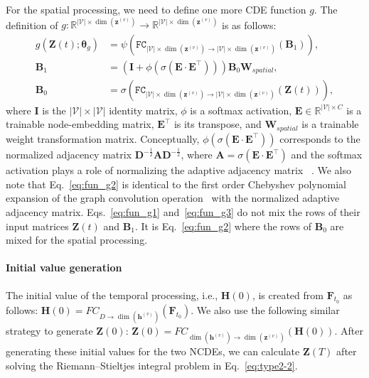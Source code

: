\documentclass[letterpaper]{article} \usepackage{aaai22}  \usepackage{times}  \usepackage{helvet}  \usepackage{courier}  \usepackage[hyphens]{url}  \usepackage{graphicx} \urlstyle{rm} \def\UrlFont{\rm}  \usepackage{natbib}  \usepackage{caption} \DeclareCaptionStyle{ruled}{labelfont=normalfont,labelsep=colon,strut=off} \frenchspacing  \setlength{\pdfpagewidth}{8.5in}  \setlength{\pdfpageheight}{11in}  \usepackage{stfloats}
\begin{document}
For the spatial processing, we need to define one more CDE function $g$. The definition of $g:\mathbb{R}^{|\mathcal{V}| \times \dim(\bm{z}^{(v)})} \rightarrow \mathbb{R}^{|\mathcal{V}| \times \dim(\bm{z}^{(v)})}$ is as follows:
\begin{align}
g(\bm{Z}(t);\bm{\theta}_g) &= \psi(\texttt{FC}_{|\mathcal{V}| \times \dim(\bm{z}^{(v)}) \rightarrow |\mathcal{V}| \times \dim(\bm{z}^{(v)})}(\bm{B}_1)),\label{eq:fun_g1}\\
\bm{B}_1 &= (\bm{I} + \phi(\sigma(\bm{E}\cdot\bm{E}^{\intercal})))\bm{B}_0\bm{W}_{spatial},\label{eq:fun_g2}\\
\bm{B}_0 &= \sigma(\texttt{FC}_{|\mathcal{V}| \times \dim(\bm{z}^{(v)}) \rightarrow |\mathcal{V}| \times \dim(\bm{z}^{(v)})}(\bm{Z}(t))),\label{eq:fun_g3}
\end{align}
where $\bm{I}$ is the $|\mathcal{V}| \times |\mathcal{V}|$ identity matrix, $\phi$ is a softmax activation, $\bm{E} \in \mathbb{R}^{|\mathcal{V}| \times C} $ is a trainable node-embedding matrix, $\bm{E}^{\intercal}$ is its transpose, and $\bm{W}_{spatial}$ is a trainable weight transformation matrix. Conceptually, $\phi(\sigma(\bm{E}\cdot\bm{E}^{\intercal}))$ corresponds to the normalized adjacency matrix $\bm{D}^{-\frac{1}{2}}\bm{A}\bm{D}^{-\frac{1}{2}}$, where $\bm{A} = \sigma(\bm{E}\cdot\bm{E}^{\intercal})$ and the softmax activation plays a role of normalizing the adaptive adjacency matrix ~\cite{wu2019graphwavenet,NEURIPS2020_ce1aad92}. We also note that Eq.~\eqref{eq:fun_g2} is identical to the first order Chebyshev polynomial expansion of the graph convolution operation~\cite{kipf2017semi} with the normalized adaptive adjacency matrix. Eqs.~\eqref{eq:fun_g1} and~\eqref{eq:fun_g3} do not mix the rows of their input matrices $\bm{Z}(t)$ and $\bm{B}_1$. It is Eq.~\eqref{eq:fun_g2} where the rows of $\bm{B}_0$ are mixed for the spatial processing.

\paragraph{Initial value generation} The initial value of the temporal processing, i.e., $\bm{H}(0)$, is created from $\bm{F}_{t_0}$ as follows: $\bm{H}(0) = FC_{D \rightarrow \dim(\bm{h}^{(v)})}(\bm{F}_{t_0})$. We also use the following similar strategy to generate $\bm{Z}(0)$: $\bm{Z}(0) = FC_{\dim(\bm{h}^{(v)}) \rightarrow \dim(\bm{z}^{(v)})}(\bm{H}(0))$. After generating these initial values for the two NCDEs, we can calculate $\bm{Z}(T)$ after solving the Riemann--Stieltjes integral problem in Eq.~\eqref{eq:type2-2}.
\end{document}
